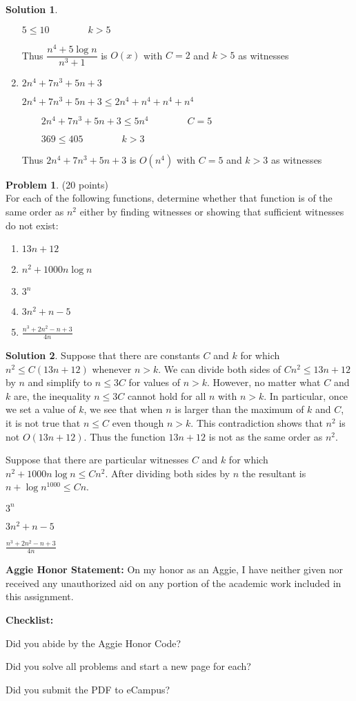 \documentclass{article}
\theoremstyle{definition}
\newtheorem{problem}{Problem}
\newtheorem*{solution}{Solution}
\newcommand{\honor}{\noindent \textbf{Aggie Honor Statement: }On my honor as an Aggie, I have neither
  given nor received any unauthorized aid on any portion of the academic work included in this assignment.
}
\newcommand{\checklist}{\noindent\textbf{Checklist:}
\begin{compactenum}
\item Did you abide by the Aggie Honor Code?
\item Did you solve all problems and start a new page for each?
\item Did you submit the PDF to eCampus?
\end{compactenum}
}
\begin{document}
\begin{solution}
\begin{enumerate}
\qquad $5\leq 10\qquad \qquad k>5$

\qquad Thus $\dfrac{n^{4}+5\log {n}}{n^{3}+1}$ is $O(x)$ with $C=2$ and $k>5$
as witnesses

\item $2n^{4}+7n^{3}+5n+3$

\qquad $2n^{4}+7n^{3}+5n+3\leq 2n^{4}+n^{4}+n^{4}+n^{4}$

$\qquad 2n^{4}+7n^{3}+5n+3\leq 5n^{4}\qquad \qquad C=5$

$\qquad 369\leq 405\qquad \qquad k>3$\newline

\qquad Thus $2n^{4}+7n^{3}+5n+3$ is $O(n^{4})$ with $C=5$ and $k>3$ as
witnesses
\end{enumerate}


\end{solution}

\newpage

\begin{problem} (20 points)\\
For each of the following functions, determine whether that function is of the same order as $n^2$ either by finding witnesses or showing that sufficient witnesses do not exist:
\begin{enumerate}
\item $13n+12$
\item $n^2+1000 n\log{n}$
\item $3^n$
\item $3n^2+n-5$
\item $\displaystyle \frac{n^3+2n^2-n+3}{4n}$
\end{enumerate}
\end{problem}

\begin{solution}

\item Suppose that there are constants $C$ and $k$ for which $n^2 \leq C(13n+12)$ whenever $n > k$. We can divide both
		sides of $Cn^2 \leq 13n+12$ by $n$ and simplify to $n \leq 3C$ for values of $n > k$. However, no matter what
        $C$ and $k$ are, the inequality $n \leq 3C$ cannot hold for all $n$ with $n > k$. In particular, once we set a
        value of $k$, we see that when $n$ is larger than the maximum of $k$ and $C$, it is not true that $n \leq C$
        even though $n > k$. This contradiction shows that $n^2$ is not $O(13n+12)$. Thus the function $13n+12$ is not
        as the same order as $n^2$.
\item Suppose that there are particular witnesses $C$ and $k$ for which $n^2+1000n\log{n} \leq Cn^2$. After dividing both sides by $n$ the resultant is $ n + \log{{n}^{1000}}\leq Cn$.
\item $3^n$
\item $3n^2+n-5$
\item $\displaystyle \frac{n^3+2n^2-n+3}{4n}$

\end{solution}


\newpage


\bigskip
\honor

\bigskip
\checklist
\end{document}

